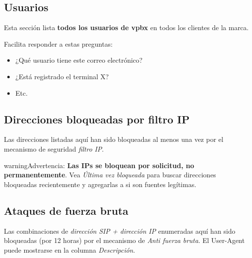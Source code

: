 \documentclass[letterpaper,10pt,spanish]{sphinxmanual}
\begin{document}
\subsection{Usuarios}
\label{administration_portal/brand/views/users::doc}\label{administration_portal/brand/views/users:users}
Esta sección lista \textbf{todos los usuarios de vpbx} en todos los clientes de la marca.

Facilita responder a estas preguntas:
\begin{itemize}
\item {} 
¿Qué usuario tiene este correo electrónico?

\item {} 
¿Está registrado el terminal X?

\item {} 
Etc.

\end{itemize}


\subsection{Direcciones bloqueadas por filtro IP}
\label{administration_portal/brand/views/ipfilter_blocked_addresses:ip-filter-blocked-addresses}\label{administration_portal/brand/views/ipfilter_blocked_addresses::doc}\label{administration_portal/brand/views/ipfilter_blocked_addresses:id1}
Las direcciones listadas aquí han sido bloqueadas al menos una vez por el mecanismo de seguridad \emph{filtro IP}.

\begin{notice}{warning}{Advertencia:}
\textbf{Las IPs se bloquean por solicitud, no permanentemente}. Vea \emph{Última vez bloqueada} para buscar direcciones bloqueadas recientemente y agregarlas a {\hyperref[security_and_maintenance/security/authorized_ip_ranges:authorized\string-ip\string-ranges]{}} si son fuentes legítimas.
\end{notice}


\subsection{Ataques de fuerza bruta}
\label{administration_portal/brand/views/bruteforce_attacks::doc}\label{administration_portal/brand/views/bruteforce_attacks:brute-force-attacks}\label{administration_portal/brand/views/bruteforce_attacks:id1}
Las combinaciones de \emph{dirección SIP + dirección IP} enumeradas aquí han sido bloqueadas (por 12 horas) por el mecanismo de \emph{Anti fuerza bruta}. El User-Agent puede mostrarse en la columna \emph{Descripción}.
\end{document}
